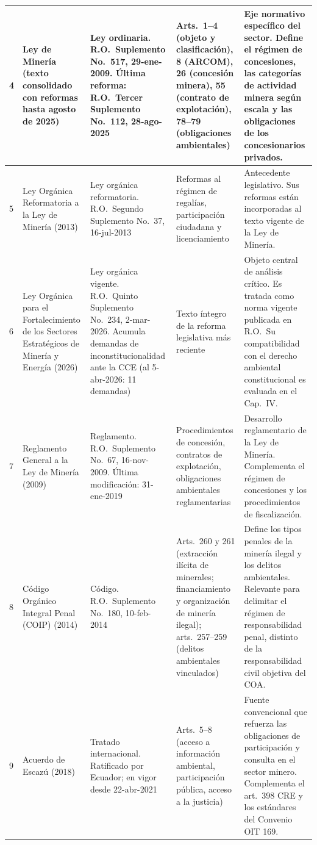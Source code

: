 \begin{longtable}{|p{}|p{}|p{}|p{}|p{}|}
4 &
Ley de Minería (texto consolidado con reformas hasta agosto de 2025) &
Ley ordinaria. R.O.\ Suplemento No.\ 517, 29-ene-2009. Última reforma: R.O.\ Tercer Suplemento No.\ 112, 28-ago-2025 &
Arts.\ 1--4 (objeto y clasificación), 8 (ARCOM), 26 (concesión minera), 55 (contrato de explotación), 78--79 (obligaciones ambientales) &
Eje normativo específico del sector. Define el régimen de concesiones, las categorías de actividad minera según escala y las obligaciones de los concesionarios privados. \\
\hline

5 &
Ley Orgánica Reformatoria a la Ley de Minería (2013) &
Ley orgánica reformatoria. R.O.\ Segundo Suplemento No.\ 37, 16-jul-2013 &
Reformas al régimen de regalías, participación ciudadana y licenciamiento &
Antecedente legislativo. Sus reformas están incorporadas al texto vigente de la Ley de Minería. \\
\hline

6 &
Ley Orgánica para el Fortalecimiento de los Sectores Estratégicos de Minería y Energía (2026) &
Ley orgánica vigente. R.O.\ Quinto Suplemento No.\ 234, 2-mar-2026. Acumula demandas de inconstitucionalidad ante la CCE (al 5-abr-2026: 11 demandas) &
Texto íntegro de la reforma legislativa más reciente &
Objeto central de análisis crítico. Es tratada como norma vigente publicada en R.O.\ Su compatibilidad con el derecho ambiental constitucional es evaluada en el Cap.\ IV. \\
\hline

7 &
Reglamento General a la Ley de Minería (2009) &
Reglamento. R.O.\ Suplemento No.\ 67, 16-nov-2009. Última modificación: 31-ene-2019 &
Procedimientos de concesión, contratos de explotación, obligaciones ambientales reglamentarias &
Desarrollo reglamentario de la Ley de Minería. Complementa el régimen de concesiones y los procedimientos de fiscalización. \\
\hline

8 &
Código Orgánico Integral Penal (COIP) (2014) &
Código. R.O.\ Suplemento No.\ 180, 10-feb-2014 &
Arts.\ 260 y 261 (extracción ilícita de minerales; financiamiento y organización de minería ilegal); arts.\ 257--259 (delitos ambientales vinculados) &
Define los tipos penales de la minería ilegal y los delitos ambientales. Relevante para delimitar el régimen de responsabilidad penal, distinto de la responsabilidad civil objetiva del COA. \\
\hline

9 &
Acuerdo de Escazú (2018) &
Tratado internacional. Ratificado por Ecuador; en vigor desde 22-abr-2021 &
Arts.\ 5--8 (acceso a información ambiental, participación pública, acceso a la justicia) &
Fuente convencional que refuerza las obligaciones de participación y consulta en el sector minero. Complementa el art.\ 398 CRE y los estándares del Convenio OIT 169. \\
\hline


\end{longtable}
